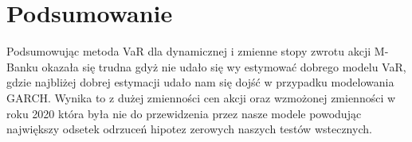 \documentclass[]{article}
\begin{document}
\section{Podsumowanie}

Podsumowując metoda VaR dla dynamicznej i zmienne stopy zwrotu akcji M-Banku okazała się trudna gdyż nie udało się wy estymować dobrego modelu VaR, gdzie najbliżej dobrej estymacji udało nam się dojść w przypadku modelowania GARCH. Wynika to z dużej zmienności cen akcji oraz wzmożonej zmienności w roku 2020 która była nie do przewidzenia przez nasze modele powodując największy odsetek odrzuceń hipotez zerowych naszych testów wstecznych.
\end{document}

